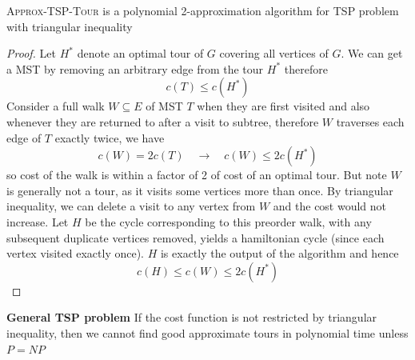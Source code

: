 \documentclass[11pt]{article}
\begin{document}
\begin{theorem*}
    \textsc{Approx-TSP-Tour} is a polynomial 2-approximation algorithm for TSP problem with triangular inequality
    \begin{proof}
        Let $H^*$ denote an optimal tour of $G$ covering all vertices of $G$. We can get a MST by removing an arbitrary edge from the tour $H^*$ therefore 
        \[
            c(T)\leq c(H^*)
        \]
        Consider a full walk $W\subseteq E$ of MST $T$ when they are first visited and also whenever they are returned to after a visit to subtree, therefore $W$ traverses each edge of $T$ exactly twice, we have 
        \[
            c(W) = 2c(T) \quad \to \quad c(W)\leq 2c(H^*)
        \]
        so cost of the walk is within a factor of 2 of cost of an optimal tour. But note $W$ is generally not a tour, as it visits some vertices more than once. By triangular inequality, we can delete a visit to any vertex from $W$ and the cost would not increase. Let $H$ be the cycle corresponding to this preorder walk, with any subsequent duplicate vertices removed, yields a hamiltonian cycle (since each vertex visited exactly once). $H$ is exactly the output of the algorithm and hence 
        \[
            c(H) \leq c(W) \leq 2c(H^*)
        \]
    \end{proof}
\end{theorem*}

\begin{defn*}
    \textbf{General TSP problem} If the cost function is not restricted by triangular inequality, then we cannot find good approximate tours in polynomial time unless $P = NP$
\end{defn*}
\end{document}
